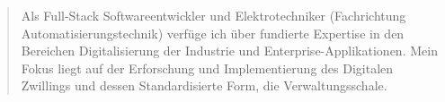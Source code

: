 \documentclass[10pt,a4paper,ragged2e,withhyper]{altacv}
\begin{document}
\begin{paracol}{2}
            \divider

            \divider

        
        
        
        
        
        \newpage
        
        \switchcolumn
        
            \begin{quote}
                Als Full-Stack Softwareentwickler und Elektrotechniker (Fachrichtung Automatisierungstechnik) verfüge ich über fundierte Expertise in den Bereichen Digitalisierung der Industrie und Enterprise-Applikationen.
                Mein Fokus liegt auf der Erforschung und Implementierung des Digitalen Zwillings und dessen Standardisierte Form, die Verwaltungsschale.
            \end{quote}
        

\end{paracol}
\end{document}
